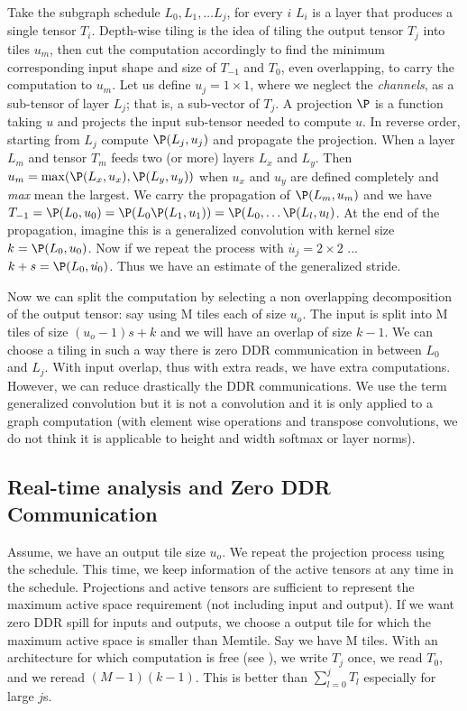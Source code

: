\documentclass[conference]{IEEEtran}
\begin{document}
Take the subgraph schedule $L_{0}, L_{1}, \dots L_{j}$, for every $i$
$L_{i}$ is a layer that produces a single tensor $T_i$. Depth-wise
tiling is the idea of tiling the output tensor $T_{j}$ into tiles
$u_{m}$, then cut the computation accordingly to find the minimum
corresponding input shape and size of $T_{-1}$ and $T_{0}$, even
overlapping, to carry the computation to $u_{m}$. Let us define $u_j =
1\times1$, where we neglect the {\em channels}, as a sub-tensor of
layer $L_{j}$; that is, a sub-vector of $T_{j}$. A projection $\P$ is
a function taking $u$ and projects the input sub-tensor needed to
compute $u$.  In reverse order, starting from $L_{j}$ compute
$\P(L_{j},u_{j})$ and propagate the projection. When a layer $L_{m}$
and tensor $T_{m}$ feeds two (or more) layers $L_{x}$ and
$L_{y}$. Then $u_{m} = \max ( \P(L_{x},u_{x}),\P(L_{y},u_{y}))$ when
$u_{x}$ and $u_{y}$ are defined completely and {\em max} mean the
largest. We carry the propagation of $\P(L_{m},u_{m})$ and we have
$T_{-1} =\P(L_{0}, u_{0}) =\P(L_{0} \P(L_{1},u_{1}))=\P(L_{0}, \dots
\P(L_{l}, u_{l})$.  At the end of the propagation, imagine this is a
generalized convolution with kernel size $k = \P(L_{0}, u_{0})$. Now
if we repeat the process with $\dot{u_{j}} = 2\times 2$ ... $k+s =
\P(L_{0}, \dot{u_{0}})$. Thus we have an estimate of the generalized
stride.


Now we can split the computation by selecting a non overlapping
decomposition of the output tensor: say using M tiles each of size
$u_o$. The input is split into M tiles of size $(u_o-1)s+k$ and we
will have an overlap of size $k-1$. We can choose a tiling in such a
way there is zero DDR communication in between $L_{0}$ and $L_{j}$.
With input overlap, thus with extra reads, we have extra
computations. However, we can reduce drastically the DDR
communications. We use the term generalized convolution but it is not
a convolution and it is only applied to a graph computation (with
element wise operations and transpose convolutions, we do not think it
is applicable to height and width softmax or layer norms).




\subsection{Real-time analysis and Zero DDR Communication}
Assume, we have an output tile size $u_{o}$. We repeat the projection
process using the schedule. This time, we keep information of the
active tensors at any time in the schedule. Projections and active
tensors are sufficient to represent the maximum active space
requirement (not including input and output). If we want zero DDR
spill for inputs and outputs, we choose a output tile for which the
maximum active space is smaller than Memtile. Say we have M
tiles. With an architecture for which computation is free (see
\cite{Hong1981IOCT,BilardiPD00}), we write $T_j$ once, we read $T_0$,
and we reread $(M-1)(k-1)$. This is better than $\sum_{l=0}^j T_l$
especially for large $j$s.
\end{document}
